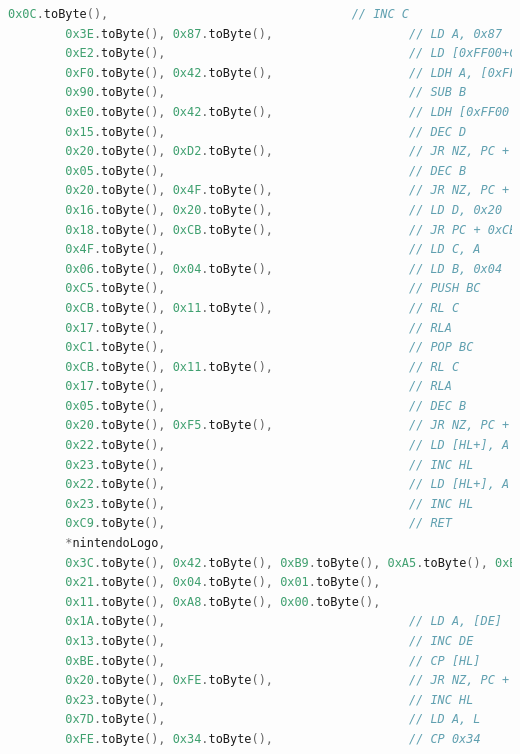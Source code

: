 \begin{lstlisting}[language=Kotlin, caption={Secuencia de arranque y logo de Nintendo}, label={code:kotlinboot}]
        0x0C.toByte(),                                  // INC C
        0x3E.toByte(), 0x87.toByte(),                   // LD A, 0x87
        0xE2.toByte(),                                  // LD [0xFF00+C], A
        0xF0.toByte(), 0x42.toByte(),                   // LDH A, [0xFF00 + 0x42]
        0x90.toByte(),                                  // SUB B
        0xE0.toByte(), 0x42.toByte(),                   // LDH [0xFF00 + 0x42], A
        0x15.toByte(),                                  // DEC D
        0x20.toByte(), 0xD2.toByte(),                   // JR NZ, PC + 0xD2
        0x05.toByte(),                                  // DEC B
        0x20.toByte(), 0x4F.toByte(),                   // JR NZ, PC + 0x4F
        0x16.toByte(), 0x20.toByte(),                   // LD D, 0x20
        0x18.toByte(), 0xCB.toByte(),                   // JR PC + 0xCB
        0x4F.toByte(),                                  // LD C, A
        0x06.toByte(), 0x04.toByte(),                   // LD B, 0x04
        0xC5.toByte(),                                  // PUSH BC
        0xCB.toByte(), 0x11.toByte(),                   // RL C
        0x17.toByte(),                                  // RLA
        0xC1.toByte(),                                  // POP BC
        0xCB.toByte(), 0x11.toByte(),                   // RL C
        0x17.toByte(),                                  // RLA
        0x05.toByte(),                                  // DEC B
        0x20.toByte(), 0xF5.toByte(),                   // JR NZ, PC + 0xF5
        0x22.toByte(),                                  // LD [HL+], A
        0x23.toByte(),                                  // INC HL
        0x22.toByte(),                                  // LD [HL+], A
        0x23.toByte(),                                  // INC HL
        0xC9.toByte(),                                  // RET
        *nintendoLogo,
        0x3C.toByte(), 0x42.toByte(), 0xB9.toByte(), 0xA5.toByte(), 0xB9.toByte(), 0xA5.toByte(), 0x42.toByte(), 0x3C.toByte(),
        0x21.toByte(), 0x04.toByte(), 0x01.toByte(),
        0x11.toByte(), 0xA8.toByte(), 0x00.toByte(),
        0x1A.toByte(),                                  // LD A, [DE]
        0x13.toByte(),                                  // INC DE
        0xBE.toByte(),                                  // CP [HL]
        0x20.toByte(), 0xFE.toByte(),                   // JR NZ, PC + 0xFE
        0x23.toByte(),                                  // INC HL
        0x7D.toByte(),                                  // LD A, L
        0xFE.toByte(), 0x34.toByte(),                   // CP 0x34

\end{lstlisting}
